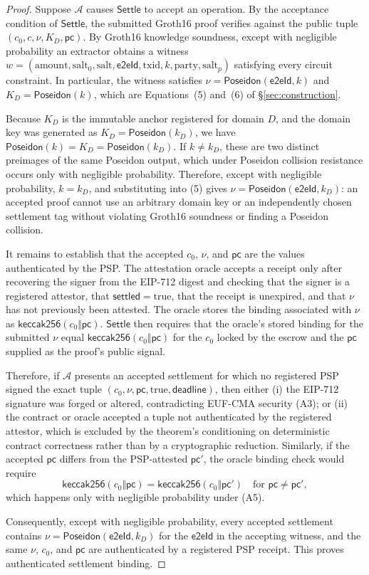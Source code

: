 \documentclass[11pt]{article}
\newcommand{\Poseidon}{\ensuremath{\mathsf{Poseidon}}}
\newcommand{\eeid}{\ensuremath{\mathsf{e2eId}}}
\begin{document}
\begin{proof}
Suppose $\mathcal{A}$ causes $\mathsf{Settle}$ to accept an operation. By the
acceptance condition of $\mathsf{Settle}$, the submitted Groth16 proof verifies
against the public tuple $(c_0,c,\nu,K_D,\mathsf{pc})$. By Groth16 knowledge
soundness, except with negligible probability an extractor obtains a witness
$w=(\text{amount},\text{salt}_0,\text{salt},
\eeid,\text{txid},k,\text{party},\text{salt}_p)$ satisfying every circuit
constraint. In particular, the witness satisfies $\nu=\Poseidon(\eeid,k)$ and
$K_D=\Poseidon(k)$, which are Equations~(5) and~(6) of \S\ref{sec:construction}.

Because $K_D$ is the immutable anchor registered for domain $D$, and the domain
key was generated as $K_D=\Poseidon(k_D)$, we have
$\Poseidon(k)=K_D=\Poseidon(k_D)$. If $k\neq k_D$, these are two distinct
preimages of the same Poseidon output, which under Poseidon collision resistance
occurs only with negligible probability. Therefore, except with negligible
probability, $k=k_D$, and substituting into (5) gives $\nu=\Poseidon(\eeid,k_D)$:
an accepted proof cannot use an arbitrary domain key or an independently chosen
settlement tag without violating Groth16 soundness or finding a Poseidon
collision.

It remains to establish that the accepted $c_0$, $\nu$, and $\mathsf{pc}$ are
the values authenticated by the PSP. The attestation oracle accepts a receipt
only after recovering the signer from the EIP-712 digest and checking that the
signer is a registered attestor, that $\mathsf{settled}=\mathrm{true}$, that the
receipt is unexpired, and that $\nu$ has not previously been attested. The oracle
stores the binding associated with $\nu$ as
$\mathsf{keccak256}(c_0\Vert\mathsf{pc})$. $\mathsf{Settle}$ then requires that
the oracle's stored binding for the submitted $\nu$ equal
$\mathsf{keccak256}(c_0\Vert\mathsf{pc})$ for the $c_0$ locked by the escrow and
the $\mathsf{pc}$ supplied as the proof's public signal.

Therefore, if $\mathcal{A}$ presents an accepted settlement for which no
registered PSP signed the exact tuple
$(c_0,\nu,\mathsf{pc},\mathrm{true},\mathsf{deadline})$, then either (i) the
EIP-712 signature was forged or altered, contradicting EUF-CMA security (A3); or
(ii) the contract or oracle accepted a tuple not authenticated by the registered
attestor, which is excluded by the theorem's conditioning on deterministic
contract correctness rather than by a cryptographic reduction. Similarly, if the
accepted $\mathsf{pc}$ differs from the PSP-attested $\mathsf{pc}'$, the oracle
binding check would require
\[
\mathsf{keccak256}(c_0\Vert\mathsf{pc})=\mathsf{keccak256}(c_0\Vert\mathsf{pc}')
\quad\text{for }\mathsf{pc}\neq\mathsf{pc}',
\]
which happens only with negligible probability under (A5).

Consequently, except with negligible probability, every accepted settlement
contains $\nu=\Poseidon(\eeid,k_D)$ for the \eeid{} in the accepting witness,
and the same $\nu$, $c_0$, and $\mathsf{pc}$ are authenticated by a registered
PSP receipt. This proves authenticated settlement binding.
\end{proof}
\end{document}
